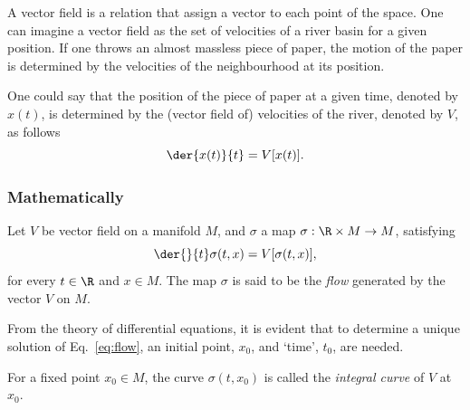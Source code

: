 A vector field is a relation that assign a vector to each point of the space. One can imagine a vector field as the set of velocities of a river basin for a given position. If one throws an almost massless piece of paper, the motion of the paper is determined by the velocities of the neighbourhood at its position.

One could say that the position of the piece of paper at a given time, denoted by $x(t)$, is determined by the (vector field of) velocities of the river, denoted by $V$, as follows
\begin{equation}
  \der{x(t)}{t} = V[x(t)].
\end{equation}

\subsubsection*{Mathematically}

Let $V$ be  vector field  on a manifold $M$, and $\sigma$ a map  \mbox{$\sigma:\R\times M\to M$}, satisfying
\begin{equation}
  \der{}{t}\sigma(t,x) = V[\sigma(t,x)],
  \label{eq:flow}
\end{equation}
for every $t\in \R$ and $x\in M$. The map $\sigma$ is said to be the \emph{flow} 
generated by the vector $V$ on $M$.

From the theory of differential equations, it is evident that to determine a unique solution of Eq.~\eqref{eq:flow}, an initial point, $x_0$, and `time', $t_0$, are needed.

For a fixed point $x_0\in M$, the curve $\sigma(t,x_0)$ is called the \emph{integral curve} 
of $V$ at $x_0$.


